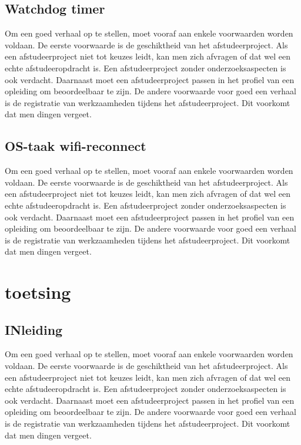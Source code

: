 		\section{Watchdog timer}
		Om een goed verhaal op te stellen, moet vooraf aan enkele voorwaarden
		worden voldaan. De eerste voorwaarde is de geschiktheid van het
		afstudeerproject. Als een afstudeerproject niet tot keuzes leidt, kan
		men zich afvragen of dat wel een echte afstudeeropdracht is. Een
		afstudeerproject zonder onderzoeksaspecten is ook verdacht. Daarnaast
		moet een afstudeerproject passen in het profiel van een opleiding om
		beoordeelbaar te zijn. De andere voorwaarde voor goed een verhaal is
		de registratie van werkzaamheden tijdens het afstudeerproject. Dit
		voorkomt dat men dingen vergeet.
		
		\section{OS-taak wifi-reconnect }
		Om een goed verhaal op te stellen, moet vooraf aan enkele voorwaarden
		worden voldaan. De eerste voorwaarde is de geschiktheid van het
		afstudeerproject. Als een afstudeerproject niet tot keuzes leidt, kan
		men zich afvragen of dat wel een echte afstudeeropdracht is. Een
		afstudeerproject zonder onderzoeksaspecten is ook verdacht. Daarnaast
		moet een afstudeerproject passen in het profiel van een opleiding om
		beoordeelbaar te zijn. De andere voorwaarde voor goed een verhaal is
		de registratie van werkzaamheden tijdens het afstudeerproject. Dit
		voorkomt dat men dingen vergeet.
		\chapter{toetsing}
		
		
		\section{INleiding}
		
		Om een goed verhaal op te stellen, moet vooraf aan enkele voorwaarden
		worden voldaan. De eerste voorwaarde is de geschiktheid van het
		afstudeerproject. Als een afstudeerproject niet tot keuzes leidt, kan
		men zich afvragen of dat wel een echte afstudeeropdracht is. Een
		afstudeerproject zonder onderzoeksaspecten is ook verdacht. Daarnaast
		moet een afstudeerproject passen in het profiel van een opleiding om
		beoordeelbaar te zijn. De andere voorwaarde voor goed een verhaal is
		de registratie van werkzaamheden tijdens het afstudeerproject. Dit
		voorkomt dat men dingen vergeet.
